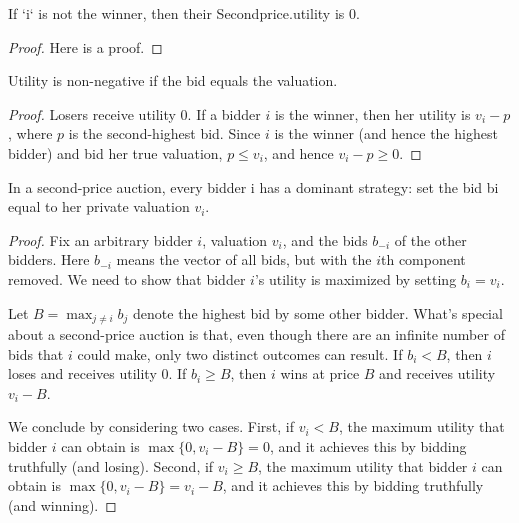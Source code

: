 \begin{lemma}\label{Secondprice.utility_loser}
    \leanok
    If `i` is not the winner, then their Secondprice.utility is 0.
\end{lemma}
\begin{proof}
    Here is a proof.
\end{proof}


\begin{lemma}\label{Secondprice.utility_nneg}
    \leanok
    Utility is non-negative if the bid equals the valuation.
\end{lemma}
\begin{proof}
Losers receive utility 0. If a bidder \(i\) is the winner, then her utility is \(v_i - p\), where \(p\) is the second-highest bid. Since \(i\) is the winner (and hence the highest bidder) and bid her true valuation, \(p \leq v_i\), and hence \(v_i - p \geq 0\). 
\end{proof}

\begin{lemma}\label{Secondprice.valuation_is_dominant}
    \leanok

          In a second-price auction, every bidder i has a dominant strategy: set the bid bi equal to her private valuation \(v_i\).
\end{lemma}
\begin{proof}
Fix an arbitrary bidder \(i\), valuation \(v_i\), and the bids \(b_{-i}\) of the other bidders. Here \(b_{-i}\) means the vector of all bids, but with the \(i\)th component removed. We need to show that bidder \(i\)'s utility is maximized by setting \(b_i = v_i\).

Let \(B = \max_{j \neq i} b_j\) denote the highest bid by some other bidder. What's special about a second-price auction is that, even though there are an infinite number of bids that \(i\) could make, only two distinct outcomes can result. If \(b_i < B\), then \(i\) loses and receives utility 0. If \(b_i \geq B\), then \(i\) wins at price \(B\) and receives utility \(v_i - B\).
    
We conclude by considering two cases. First, if \(v_i < B\), the maximum utility that bidder \(i\) can obtain is \(\max\{0, v_i - B\} = 0\), and it achieves this by bidding truthfully (and losing). Second, if \(v_i \geq B\), the maximum utility that bidder \(i\) can obtain is \(\max\{0, v_i - B\} = v_i - B\), and it achieves this by bidding truthfully (and winning).
\end{proof}







